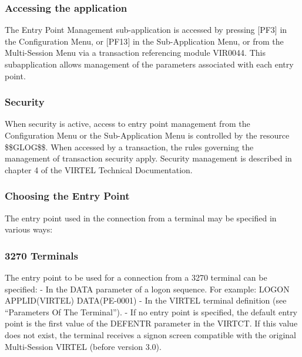 \documentclass[letterpaper,10pt,english]{sphinxmanual}
\begin{document}
\subsubsection{Accessing the application}
\label{\detokenize{connectivity_guide:accessing-the-application}}
The Entry Point Management sub-application is accessed by pressing {[}PF3{]} in the Configuration Menu, or {[}PF13{]} in the Sub-Application Menu, or from the Multi-Session Menu via a transaction referencing module VIR0044. This subapplication allows management of the parameters associated with each entry point.


\subsubsection{Security}
\label{\detokenize{connectivity_guide:id6}}
When security is active, access to entry point management from the Configuration Menu or the Sub-Application Menu is controlled by the resource \$\$GLOG\$\$. When accessed by a transaction, the rules governing the management of transaction security apply. Security management is described in chapter 4 of the VIRTEL Technical Documentation.


\subsubsection{Choosing the Entry Point}
\label{\detokenize{connectivity_guide:choosing-the-entry-point}}
The entry point used in the connection from a terminal may be specified in various ways:


\subsubsection{3270 Terminals}
\label{\detokenize{connectivity_guide:id7}}
The entry point to be used for a connection from a 3270 terminal can be specified:
- In the DATA parameter of a logon sequence. For example: LOGON APPLID(VIRTEL) DATA(PE-0001)
- In the VIRTEL terminal definition (see “Parameters Of The Terminal”).
- If no entry point is specified, the default entry point is the first value of the DEFENTR parameter in the VIRTCT. If this value does not exist, the terminal receives a signon screen compatible with the original Multi-Session VIRTEL (before version 3.0).
\end{document}
